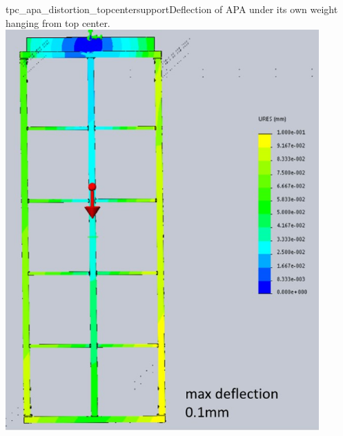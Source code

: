 \begin{cdrfigure}{tpc_apa_distortion_topcentersupport}{Deflection of APA under its own weight hanging from top center.}
\includegraphics[width=0.9\textwidth]{figures/tpc_apa_distortion_topcentersupport.png} 
\end{cdrfigure}

